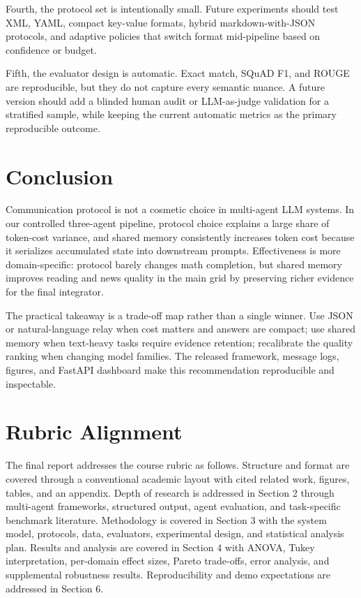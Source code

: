 \documentclass[11pt]{article}
\begin{document}
Fourth, the protocol set is intentionally small. Future experiments should test XML, YAML, compact key-value formats, hybrid markdown-with-JSON protocols, and adaptive policies that switch format mid-pipeline based on confidence or budget.

Fifth, the evaluator design is automatic. Exact match, SQuAD F1, and ROUGE are reproducible, but they do not capture every semantic nuance. A future version should add a blinded human audit or LLM-as-judge validation for a stratified sample, while keeping the current automatic metrics as the primary reproducible outcome.

\section{Conclusion}

Communication protocol is not a cosmetic choice in multi-agent LLM systems. In our controlled three-agent pipeline, protocol choice explains a large share of token-cost variance, and shared memory consistently increases token cost because it serializes accumulated state into downstream prompts. Effectiveness is more domain-specific: protocol barely changes math completion, but shared memory improves reading and news quality in the main grid by preserving richer evidence for the final integrator.

The practical takeaway is a trade-off map rather than a single winner. Use JSON or natural-language relay when cost matters and answers are compact; use shared memory when text-heavy tasks require evidence retention; recalibrate the quality ranking when changing model families. The released framework, message logs, figures, and FastAPI dashboard make this recommendation reproducible and inspectable.

\appendix
\section{Rubric Alignment}

The final report addresses the course rubric as follows. Structure and format are covered through a conventional academic layout with cited related work, figures, tables, and an appendix. Depth of research is addressed in Section 2 through multi-agent frameworks, structured output, agent evaluation, and task-specific benchmark literature. Methodology is covered in Section 3 with the system model, protocols, data, evaluators, experimental design, and statistical analysis plan. Results and analysis are covered in Section 4 with ANOVA, Tukey interpretation, per-domain effect sizes, Pareto trade-offs, error analysis, and supplemental robustness results. Reproducibility and demo expectations are addressed in Section 6.
\end{document}
